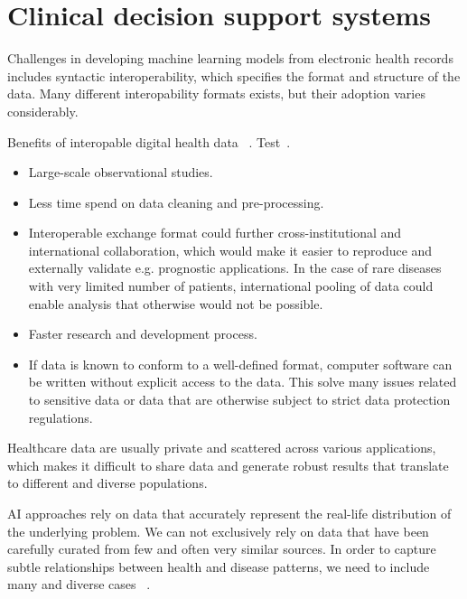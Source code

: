 

\section{Clinical decision support systems}

Challenges in developing machine learning models from electronic health records
includes syntactic interoperability, 
which specifies the format and structure of the data.
Many different interopability formats exists, 
but their adoption varies considerably.

Benefits of interopable digital health data
~\autocite{lehneWhy2019}.
Test~\cite{lehneWhy2019}.

\begin{itemize}
    \item Large-scale observational studies.
    \item Less time spend on data cleaning and pre-processing.
    \item Interoperable exchange format could further cross-institutional
    and international collaboration, which would make it easier 
    to reproduce and externally validate e.g. prognostic applications.
    In the case of rare diseases with very limited number of patients, 
    international pooling of data could enable analysis
    that otherwise would not be possible.
    \item Faster research and development process.
    \item If data is known to conform to a well-defined format,
    computer software can be written without explicit access to the data.
    This solve many issues related to sensitive data or
    data that are otherwise subject to strict data protection regulations.
\end{itemize}


Healthcare data are usually private and scattered across various applications,
which makes it difficult to share data and generate robust results 
that translate to different and diverse populations.

AI approaches rely on data that accurately represent
the real-life distribution of the underlying problem.
We can not exclusively rely on data that have been carefully curated 
from few and often very similar sources. 
In order to capture subtle relationships 
between health and disease patterns,
we need to include many and diverse cases~%
\autocite{riekeFuture2020}.

